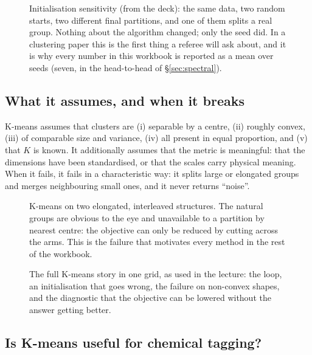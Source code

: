 \begin{figure}[htbp]\centering
  \caption{Initialisation sensitivity (from the deck): the same data, two
  random starts, two different final partitions, and one of them splits a real
  group. Nothing about the algorithm changed; only the seed did. In a
  clustering paper this is the first thing a referee will ask about, and it is
  why every number in this workbook is reported as a mean over seeds (seven, in
  the head-to-head of \S\ref{sec:spectral}).}
  \label{fig:kmeansinit}
\end{figure}

\subsection{What it assumes, and when it breaks}

\begin{issues} K-means assumes that clusters are (i)
separable by a centre, (ii) roughly convex, (iii) of comparable size and
variance, (iv) all present in equal proportion, and (v) that $K$ is known. It
additionally assumes that the metric is meaningful: that the dimensions have
been standardised, or that the scales carry physical meaning. When it fails, it
fails in a characteristic way: it splits large or elongated groups and merges
neighbouring small ones, and it never returns ``noise''.
\end{issues}

\begin{figure}[htbp]\centering
  \caption{K-means on two elongated, interleaved structures. The natural
  groups are obvious to the eye and unavailable to a partition by nearest
  centre: the objective can only be reduced by cutting across the arms. This
  is the failure that motivates every method in the rest of the workbook.}
  \label{fig:kmeansfail}
\end{figure}

\begin{figure}[htbp]\centering
  \caption{The full K-means story in one grid, as used in the lecture: the
  loop, an initialisation that goes wrong, the failure on non-convex shapes,
  and the diagnostic that the objective can be lowered without the answer
  getting better.}
  \label{fig:kmeansstory}
\end{figure}

\subsection{Is K-means useful for chemical tagging?}

